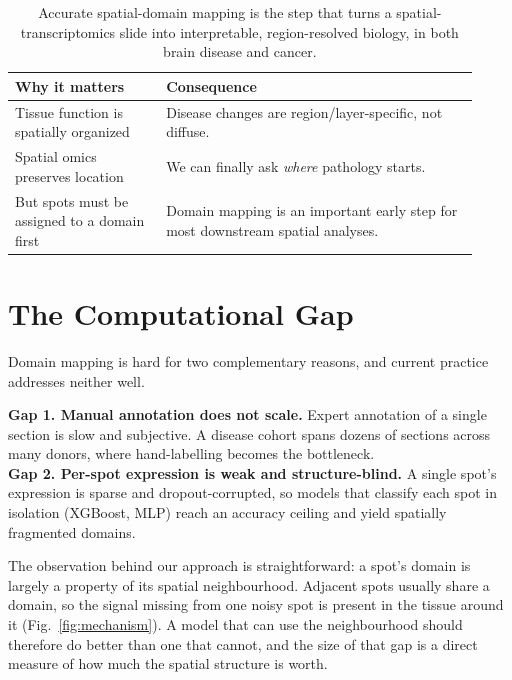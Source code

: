 \documentclass[11pt]{article}
\begin{document}
\begin{table}[H]
\centering\small
\begin{tabular}{>{\raggedright\arraybackslash}p{0.30\linewidth} >{\raggedright\arraybackslash}p{0.62\linewidth}}
\toprule
\rowcolor{sriblue}\color{white}\textbf{Why it matters} & \color{white}\textbf{Consequence}\\
\midrule
\rowcolor{srirow} Tissue function is spatially organized & Disease changes are region/layer-specific, not diffuse.\\
Spatial omics preserves location & We can finally ask \emph{where} pathology starts.\\
\rowcolor{srirow} But spots must be assigned to a domain first & Domain mapping is an important early step for most downstream spatial analyses.\\
\bottomrule
\end{tabular}
\caption{Accurate spatial-domain mapping is the step that turns a
spatial-transcriptomics slide into interpretable, region-resolved biology, in
both brain disease and cancer.}
\label{tab:significance}
\end{table}

\section{The Computational Gap}

Domain mapping is hard for two complementary reasons, and current practice
addresses neither well.

\begin{gapbox}
\textbf{Gap 1. Manual annotation does not scale.} Expert annotation of a single
section is slow and subjective. A disease cohort spans dozens of sections across
many donors, where hand-labelling becomes the bottleneck.\\[3pt]
\textbf{Gap 2. Per-spot expression is weak and structure-blind.} A single spot's
expression is sparse and dropout-corrupted, so models that classify each spot in
isolation (XGBoost, MLP) reach an accuracy ceiling and yield spatially fragmented
domains.
\end{gapbox}

\noindent The observation behind our approach is straightforward: a spot's domain
is largely a property of its spatial neighbourhood. Adjacent spots usually share
a domain, so the signal missing from one noisy spot is present in the tissue
around it (Fig.~\ref{fig:mechanism}). A model that can use the neighbourhood
should therefore do better than one that cannot, and the size of that gap is a
direct measure of how much the spatial structure is worth.
\end{document}
